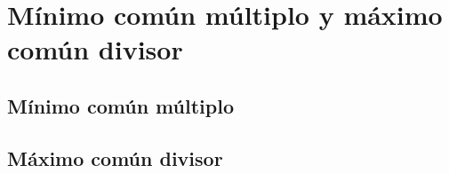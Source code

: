\thispagestyle{plain}
\section{Mínimo común múltiplo y máximo común divisor}
\subsection{Mínimo común múltiplo}
\subsection{Máximo común divisor}

\newpage